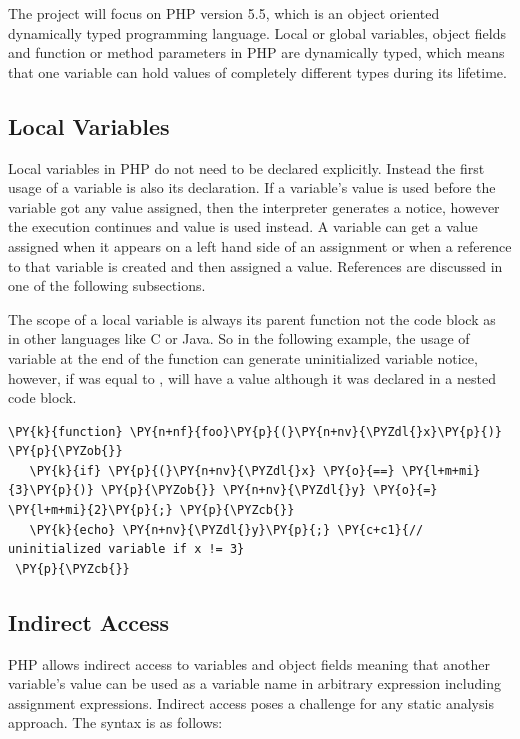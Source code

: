 The project will focus on PHP version 5.5, which is an object 
oriented dynamically typed programming language. Local or global 
variables, object fields and function or method parameters in PHP 
are dynamically typed, which means that one variable can hold 
values of completely different types during its lifetime.

\subsection{Local Variables}
Local variables in PHP do not need to be declared explicitly. 
Instead the first usage of a variable is also its declaration. 
If a variable's value is used before the variable got any 
value assigned, then the interpreter generates a notice, 
however the execution continues and value  is 
used instead. A variable can get a value assigned when it 
appears on a left hand side of an assignment or when a 
reference to that variable is created and then assigned a value. 
References are discussed in one of the following subsections.

The scope of a local variable is always its parent function not the 
code block as in other languages like C or Java. So in the following 
example, the usage of variable  at the end of the function 
can generate uninitialized variable notice, however, if  
was equal to ,  will have a value although it 
was declared in a nested code block.

\begin{Verbatim}[commandchars=\\\{\}]
 \PY{k}{function} \PY{n+nf}{foo}\PY{p}{(}\PY{n+nv}{\PYZdl{}x}\PY{p}{)} \PY{p}{\PYZob{}}
   \PY{k}{if} \PY{p}{(}\PY{n+nv}{\PYZdl{}x} \PY{o}{==} \PY{l+m+mi}{3}\PY{p}{)} \PY{p}{\PYZob{}} \PY{n+nv}{\PYZdl{}y} \PY{o}{=} \PY{l+m+mi}{2}\PY{p}{;} \PY{p}{\PYZcb{}}
   \PY{k}{echo} \PY{n+nv}{\PYZdl{}y}\PY{p}{;} \PY{c+c1}{// uninitialized variable if x != 3}
 \PY{p}{\PYZcb{}}
\end{Verbatim}

\subsection{Indirect Access}
PHP allows indirect access to variables and object fields meaning 
that another variable's value can be used as a variable name in 
arbitrary expression including assignment expressions. 
Indirect access poses a challenge for any static analysis approach. 
The syntax is as follows:

